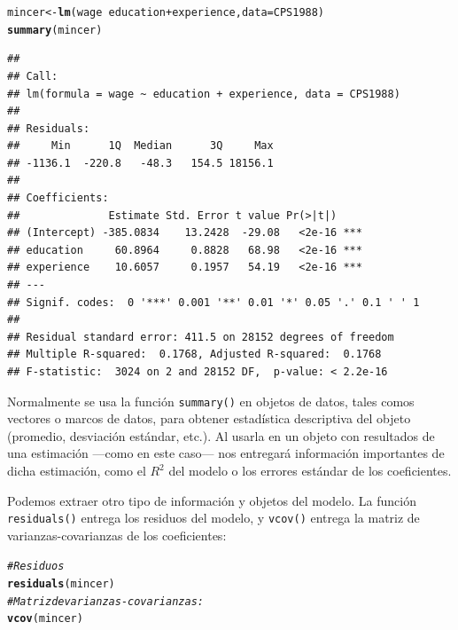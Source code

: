 \documentclass{article}\usepackage[]{graphicx}\usepackage[]{color}
\makeatletter
\newcommand{\hlcom}[1]{\textcolor[rgb]{0.678,0.584,0.686}{\textit{#1}}}%
\newcommand{\hlopt}[1]{\textcolor[rgb]{0,0,0}{#1}}%
\newcommand{\hlstd}[1]{\textcolor[rgb]{0.345,0.345,0.345}{#1}}%
\newcommand{\hlkwb}[1]{\textcolor[rgb]{0.69,0.353,0.396}{#1}}%
\newcommand{\hlkwc}[1]{\textcolor[rgb]{0.333,0.667,0.333}{#1}}%
\newcommand{\hlkwd}[1]{\textcolor[rgb]{0.737,0.353,0.396}{\textbf{#1}}}%
\newenvironment{kframe}{%
 \def\at@end@of@kframe{}%
 \ifinner\ifhmode%
  \def\at@end@of@kframe{\end{minipage}}%
  \begin{minipage}{\columnwidth}%
 \fi\fi%
 \def\FrameCommand##1{\hskip\@totalleftmargin \hskip-\fboxsep
 \colorbox{shadecolor}{##1}\hskip-\fboxsep
     \hskip-\linewidth \hskip-\@totalleftmargin \hskip\columnwidth}%
 \MakeFramed {\advance\hsize-\width
   \@totalleftmargin\z@ \linewidth\hsize
   \@setminipage}}%
 {\par\unskip\endMakeFramed%
 \at@end@of@kframe}
\newenvironment{knitrout}{}{} %
\makeatother
\begin{document}
\begin{knitrout}
\color{fgcolor}\begin{kframe}
\begin{alltt}
\hlstd{mincer} \hlkwb{<-} \hlkwd{lm}\hlstd{(wage} \hlopt{~} \hlstd{education} \hlopt{+} \hlstd{experience,} \hlkwc{data} \hlstd{= CPS1988)}
\hlkwd{summary}\hlstd{(mincer)}
\end{alltt}
\begin{verbatim}
## 
## Call:
## lm(formula = wage ~ education + experience, data = CPS1988)
## 
## Residuals:
##     Min      1Q  Median      3Q     Max 
## -1136.1  -220.8   -48.3   154.5 18156.1 
## 
## Coefficients:
##              Estimate Std. Error t value Pr(>|t|)    
## (Intercept) -385.0834    13.2428  -29.08   <2e-16 ***
## education     60.8964     0.8828   68.98   <2e-16 ***
## experience    10.6057     0.1957   54.19   <2e-16 ***
## ---
## Signif. codes:  0 '***' 0.001 '**' 0.01 '*' 0.05 '.' 0.1 ' ' 1
## 
## Residual standard error: 411.5 on 28152 degrees of freedom
## Multiple R-squared:  0.1768,	Adjusted R-squared:  0.1768 
## F-statistic:  3024 on 2 and 28152 DF,  p-value: < 2.2e-16
\end{verbatim}
\end{kframe}
\end{knitrout}

Normalmente se usa la función \verb|summary()| en objetos de datos, tales comos vectores o marcos de datos, para obtener estadística descriptiva del objeto (promedio, desviación estándar, etc.). Al usarla en un objeto con resultados de una estimación ---como en este caso--- nos entregará información importantes de dicha estimación, como el $R^2$ del modelo o los errores estándar de los coeficientes.

Podemos extraer otro tipo de información y objetos del modelo. La función \verb|residuals()| entrega los residuos del modelo, y \verb|vcov()| entrega la matriz de varianzas-covarianzas de los coeficientes:

\begin{knitrout}
\color{fgcolor}\begin{kframe}
\begin{alltt}
\hlcom{# Residuos}
\hlkwd{residuals}\hlstd{(mincer)}
\hlcom{# Matriz de varianzas-covarianzas:}
\hlkwd{vcov}\hlstd{(mincer)}
\end{alltt}
\end{kframe}
\end{knitrout}
\end{document}
